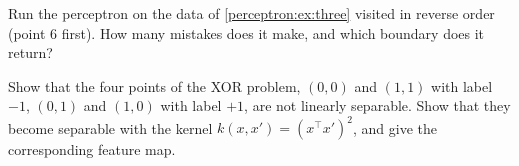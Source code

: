 \begin{notechapter}
\begin{exercise}\label{perceptron:exr:3}
Run the perceptron on the data of \cref{perceptron:ex:three} visited in reverse order
(point 6 first). How many mistakes does it make, and which boundary does it return?
\end{exercise}

\begin{exercise}\label{perceptron:exr:4}
Show that the four points of the XOR problem, $(0,0)$ and $(1,1)$ with label $-1$, $(0,1)$ and $(1,0)$
with label $+1$, are not linearly separable. Show that they become separable with the
kernel $k(x, x') = (x^\top x')^2$, and give the corresponding feature map.
\end{exercise}
\end{notechapter}
